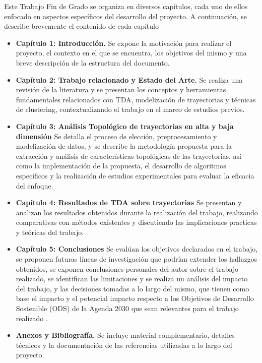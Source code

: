 Este Trabajo Fin de Grado se organiza en diversos capítulos, cada uno de ellos enfocado en aspectos específicos del desarrollo del proyecto. A continuación, se describe brevemente el contenido de cada capítulo

\begin{itemize} \item \textbf{Capítulo 1: Introducción.} Se expone la motivación para realizar el proyecto, el contexto en el que se encuentra, los objetivos del mismo y una breve descripción de la estructura del documento.

\item \textbf{Capítulo 2: Trabajo relacionado y Estado del
Arte.} Se realiza una revisión de la literatura y se presentan los conceptos y herramientas fundamentales relacionados con TDA, modelización de trayectorias y técnicas de clustering, contextualizando el trabajo en el marco de estudios previos.

\item \textbf{Capítulo 3: Análisis Topológico de trayectorias en alta y baja dimensión} Se detalla el proceso de elección, preprocesamiento y modelización de datos, y se describe la metodología propuesta para la extracción y análisis de características topológicas de las trayectorias, así como la implementación de la propuesta, el desarrollo de algoritmos específicos y la realización de estudios experimentales para evaluar la eficacia del enfoque. 

\item \textbf{Capítulo 4: Resultados de TDA sobre trayectorias} Se presentan y analizan los resultados obtenidos durante la realización del trabajo, realizando comparativas con métodos existentes y discutiendo las implicaciones practicas y teóricas del trabajo.

\vspace{1cm}
\item \textbf{Capítulo 5: Conclusiones} Se evalúan los objetivos declarados en el trabajo, se proponen futuras líneas de investigación que podrían extender los hallazgos obtenidos, se exponen conclusiones personales del autor sobre el trabajo realizado, se identifican las limitaciones y se realiza un análisis del impacto del trabajo, y las decisiones tomadas a lo largo del mismo, que tienen como base el impacto y el potencial impacto respecto a los Objetivos de Desarrollo Sostenible (ODS) de la Agenda 2030 que sean relevantes para el trabajo realizado \cite{ODS} .

\item \textbf{Anexos y Bibliografía.} Se incluye material complementario, detalles técnicos y la documentación de las referencias utilizadas a lo largo del proyecto.
\end{itemize}


